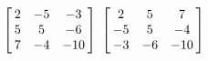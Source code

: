 {$\left[\hskip -3pt \begin{array}{ccc} 2&-5&-3\\  5&5&-6
\\  7&-4&-10\end{array}\hskip -3pt \right] $}
{$\left[\hskip -3pt \begin{array}{ccc} 2&5&7\\  -5&5&-4
\\  -3&-6&-10\end{array}\hskip -3pt \right]$}


